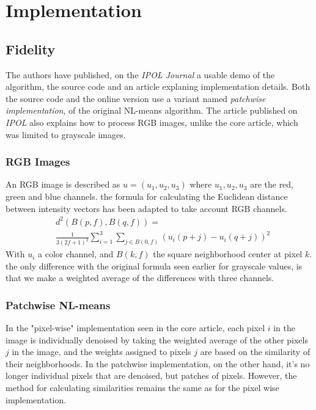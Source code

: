\documentclass[a4paper, twocolumn, twoside]{article}
\begin{document}
\section{Implementation}
\subsection{Fidelity}
The authors have published, on the \textit{IPOL Journal} \cite{nlmeanscode}
a usable demo of the algorithm, the source code and an article explaning implementation details.
Both the source code and the online version use a variant named \textit{patchwise implementation}, of the original NL-means algorithm.
The article published on \textit{IPOL} also explains how to process RGB images, unlike the core article, which was limited to grayscale images.
\subsubsection{RGB Images}
An RGB image is described as $u=(u_1, u_2, u_3)$ where $u_1, u_2, u_3$ are the red, green and blue channels.
the formula for calculating the Euclidean distance between intensity vectors has been adapted to take account RGB channels.\\
\begin{equation}
    \begin{split}
		& d^2(B(p,f), B(q,f)) = \\ 
		& \frac{1}{3(2f + 1)^2} \sum_{i=1}^{3} \sum_{j \in B(0,f)} (u_i(p +j) - u_i(q + j))^2
    \end{split}
\end{equation}
With $u_i$ a color channel, and $B(k,f)$ the square neighborhood center at pixel $k$.
the only difference with the original formula seen earlier for grayscale values,
is that we make a weighted average of the differences with three channels.
\subsubsection{Patchwise NL-means}
In the "pixel-wise" implementation seen in the core article,
each pixel $i$ in the image is individually denoised by taking
the weighted average of the other pixels $j$ in the image,
and the weights assigned to pixels $j$ are based on the similarity of
their neighborhoods.
In the patchwise implementation, on the other hand,
it's no longer individual pixels that are denoised, but patches of pixels.
However, the method for calculating similarities remains the same
as for the pixel wise implementation.
\end{document}
